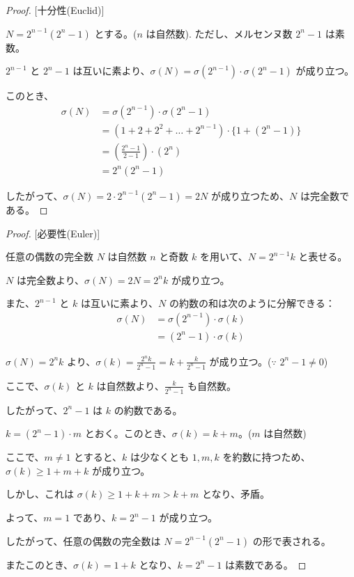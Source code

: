 \begin{proof}

[十分性(Euclid)]

\( N = 2^{n-1}(2^n - 1) \) とする。(\(n \) は自然数). ただし、メルセンヌ数 \( 2^n - 1 \) は素数。

\( 2^{n-1} \) と \( 2^n - 1 \) は互いに素より、\( \sigma(N) = \sigma(2^{n-1}) \cdot \sigma(2^n - 1) \) が成り立つ。

このとき、
\begin{align*}
\sigma(N) &= \sigma(2^{n-1}) \cdot \sigma(2^n - 1) \\
          &= (1 + 2 + 2^2 + \ldots + 2^{n-1}) \cdot \{1 + (2^n - 1)\} \\
          &= (\frac{2^n-1}{2-1}) \cdot (2^n) \\
          &= 2^n(2^n - 1)
\end{align*}

したがって、\(\sigma(N) = 2 \cdot 2^{n-1}(2^n - 1) = 2N\) が成り立つため、\( N \) は完全数である。

\end{proof}


\begin{proof}

[必要性(Euler)]

任意の偶数の完全数 \( N \) は自然数 \( n \) と奇数 \( k \) を用いて、\( N = 2^{n-1}k \) と表せる。

\( N \) は完全数より、\(\sigma(N) = 2N = 2^{n}k\) が成り立つ。

また、\(2^{n-1}\) と \( k \) は互いに素より、\(N\) の約数の和は次のように分解できる：
\begin{align*}
\sigma(N) &= \sigma(2^{n-1}) \cdot \sigma(k) \\
          &= (2^n - 1) \cdot \sigma(k)
\end{align*}

\( \sigma(N) = 2^{n}k \) より、\( \sigma(k) = \frac{2^{n}k}{2^n - 1} = k + \frac{k}{2^n-1} \) が成り立つ。(\(\because \)  \(2^n - 1 \neq 0 \))

ここで、\(\sigma(k)\) と \(k\) は自然数より、\(\frac{k}{2^n-1}\) も自然数。

したがって、\(2^n - 1\) は \(k\) の約数である。

\(k = (2^n-1) \cdot m\) とおく。このとき、\( \sigma(k) = k + m \)。(\(m \) は自然数)

ここで、\( m \neq 1 \) とすると、\(k\) は少なくとも \(1, m, k \) を約数に持つため、
\(\sigma(k) \geq 1 + m + k\) が成り立つ。

しかし、これは \( \sigma(k) \geq 1 + k + m > k + m \) となり、矛盾。

よって、\( m = 1 \) であり、\( k = 2^n - 1 \) が成り立つ。

したがって、任意の偶数の完全数は \( N = 2^{n-1}(2^n - 1) \) の形で表される。

またこのとき、\(\sigma(k) = 1 + k \) となり、\( k = 2^n - 1 \) は素数である。

\end{proof}
